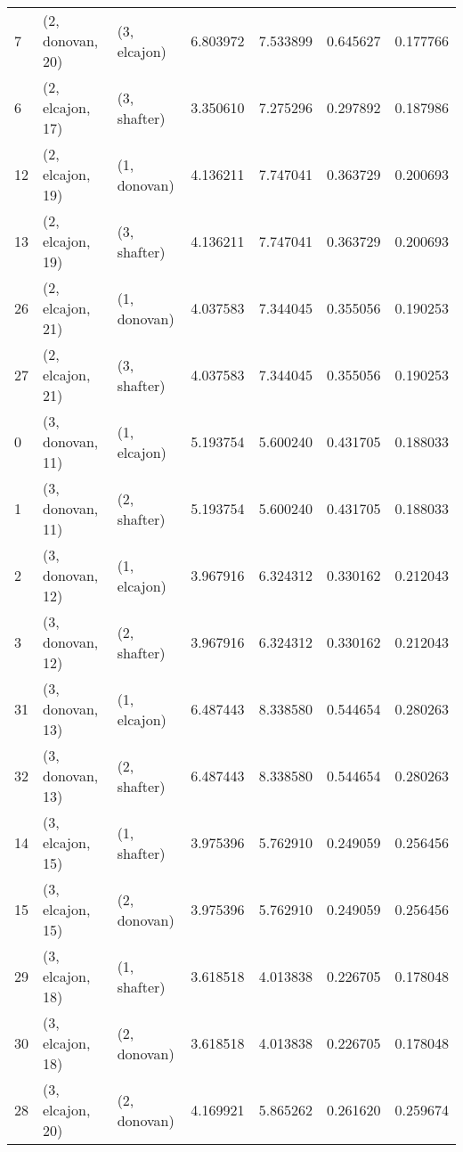 \begin{tabular}{lllrrrr}
7  &  (2, donovan, 20) &     (3, elcajon) &  6.803972 &  7.533899 &   0.645627 &  0.177766 \\
6  &  (2, elcajon, 17) &     (3, shafter) &  3.350610 &  7.275296 &   0.297892 &  0.187986 \\
12 &  (2, elcajon, 19) &     (1, donovan) &  4.136211 &  7.747041 &   0.363729 &  0.200693 \\
13 &  (2, elcajon, 19) &     (3, shafter) &  4.136211 &  7.747041 &   0.363729 &  0.200693 \\
26 &  (2, elcajon, 21) &     (1, donovan) &  4.037583 &  7.344045 &   0.355056 &  0.190253 \\
27 &  (2, elcajon, 21) &     (3, shafter) &  4.037583 &  7.344045 &   0.355056 &  0.190253 \\
0  &  (3, donovan, 11) &     (1, elcajon) &  5.193754 &  5.600240 &   0.431705 &  0.188033 \\
1  &  (3, donovan, 11) &     (2, shafter) &  5.193754 &  5.600240 &   0.431705 &  0.188033 \\
2  &  (3, donovan, 12) &     (1, elcajon) &  3.967916 &  6.324312 &   0.330162 &  0.212043 \\
3  &  (3, donovan, 12) &     (2, shafter) &  3.967916 &  6.324312 &   0.330162 &  0.212043 \\
31 &  (3, donovan, 13) &     (1, elcajon) &  6.487443 &  8.338580 &   0.544654 &  0.280263 \\
32 &  (3, donovan, 13) &     (2, shafter) &  6.487443 &  8.338580 &   0.544654 &  0.280263 \\
14 &  (3, elcajon, 15) &     (1, shafter) &  3.975396 &  5.762910 &   0.249059 &  0.256456 \\
15 &  (3, elcajon, 15) &     (2, donovan) &  3.975396 &  5.762910 &   0.249059 &  0.256456 \\
29 &  (3, elcajon, 18) &     (1, shafter) &  3.618518 &  4.013838 &   0.226705 &  0.178048 \\
30 &  (3, elcajon, 18) &     (2, donovan) &  3.618518 &  4.013838 &   0.226705 &  0.178048 \\
28 &  (3, elcajon, 20) &     (2, donovan) &  4.169921 &  5.865262 &   0.261620 &  0.259674 \\
\bottomrule
\end{tabular}
